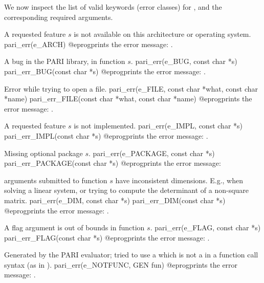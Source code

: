\noindent We now inspect the list of valid keywords (error classes) for
, and the corresponding required arguments.


 A requested feature $s$ is not available on this
architecture or operating system.
\bprog
  pari_err(e_ARCH)
@eprog\noindent prints the error message: .

 A bug in the PARI library, in function $s$.
\bprog
  pari_err(e_BUG, const char *s)
  pari_err_BUG(const char *s)
@eprog\noindent prints the error message: .

 Error while trying to open a file.
\bprog
  pari_err(e_FILE, const char *what, const char *name)
  pari_err_FILE(const char *what, const char *name)
@eprog\noindent prints the error message: .

 A requested feature $s$ is not implemented.
\bprog
  pari_err(e_IMPL, const char *s)
  pari_err_IMPL(const char *s)
@eprog\noindent prints the error message: .

 Missing optional package $s$.
\bprog
  pari_err(e_PACKAGE, const char *s)
  pari_err_PACKAGE(const char *s)
@eprog\noindent prints the error message: 


 arguments submitted to function $s$ have inconsistent
dimensions. E.g., when solving a linear system, or trying to compute the
determinant of a non-square matrix.
\bprog
  pari_err(e_DIM, const char *s)
  pari_err_DIM(const char *s)
@eprog\noindent prints the error message: .

 A flag argument is out of bounds in function $s$.
\bprog
  pari_err(e_FLAG, const char *s)
  pari_err_FLAG(const char *s)
@eprog\noindent prints the error message: .

 Generated by the PARI evaluator; tried to use a
 which is not a  in a function call syntax (as in
).
\bprog
  pari_err(e_NOTFUNC, GEN fun)
@eprog\noindent prints the error message: .

